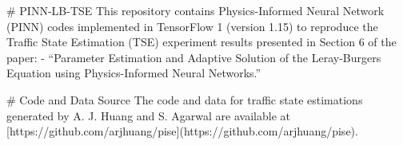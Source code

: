 # PINN-LB-TSE
This repository contains Physics-Informed Neural Network (PINN) codes implemented in TensorFlow 1 (version 1.15) to reproduce the Traffic State Estimation (TSE) experiment results presented in Section 6 of the paper:
	- “Parameter Estimation and Adaptive Solution of the Leray-Burgers Equation using Physics-Informed Neural Networks.”

# Code and Data Source
The code and  data for traffic state estimations generated by A. J. Huang and S. Agarwal are available at [https://github.com/arjhuang/pise](https://github.com/arjhuang/pise).